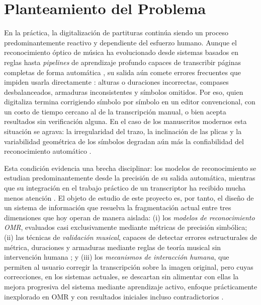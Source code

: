 \section{Planteamiento del Problema}

En la pr\'actica, la digitalizaci\'on de partituras contin\'ua siendo un
proceso predominantemente reactivo y dependiente del esfuerzo humano.
Aunque el reconocimiento \'optico de m\'usica ha evolucionado desde sistemas
basados en reglas hasta \emph{pipelines} de aprendizaje profundo capaces de
transcribir p\'aginas completas de forma autom\'atica
\cite{omr2020}\cite{calvo2018}\cite{riosvila2026}, su salida a\'un comete
errores frecuentes que impiden usarla directamente \cite{calvo2018}: alturas
o duraciones incorrectas, compases desbalanceados, armaduras inconsistentes
y s\'imbolos omitidos. Por eso, quien digitaliza termina corrigiendo
s\'imbolo por s\'imbolo en un editor convencional, con un costo de tiempo
cercano al de la transcripci\'on manual, o bien acepta resultados sin
verificaci\'on alguna. En el caso de los manuscritos modernos esta situaci\'on se
agrava: la irregularidad del trazo, la inclinaci\'on de las plicas y la
variabilidad geom\'etrica de los s\'imbolos degradan a\'un m\'as la
confiabilidad del reconocimiento autom\'atico \cite{ricordi2024}.

Esta condici\'on evidencia una brecha disciplinar: los modelos de
reconocimiento se estudian predominantemente desde la precisi\'on de su
salida autom\'atica, mientras que su integraci\'on en el trabajo pr\'actico
de un transcriptor ha recibido mucha menos atenci\'on \cite{rizo2023}. El
objeto de estudio de este proyecto es, por tanto, el dise\~no de un sistema
de informaci\'on que resuelva la fragmentaci\'on actual entre tres
dimensiones que hoy operan de manera aislada: (i) los \emph{modelos de
reconocimiento OMR}, evaluados casi exclusivamente mediante m\'etricas de
precisi\'on simb\'olica; (ii) las t\'ecnicas de \emph{validaci\'on musical},
capaces de detectar errores estructurales de m\'etrica, duraciones y
armaduras mediante reglas de teor\'ia musical sin intervenci\'on humana
\cite{cuthbert2010}; y (iii) los \emph{mecanismos de interacci\'on humana},
que permiten al usuario corregir la transcripci\'on sobre la imagen
original, pero cuyas correcciones, en los sistemas actuales, se descartan
sin alimentar con ellas la mejora progresiva del sistema mediante
aprendizaje activo, enfoque pr\'acticamente inexplorado en OMR y con
resultados iniciales incluso contradictorios \cite{amershi2014}%
\cite{settles2009}\cite{mlsp2025}.

